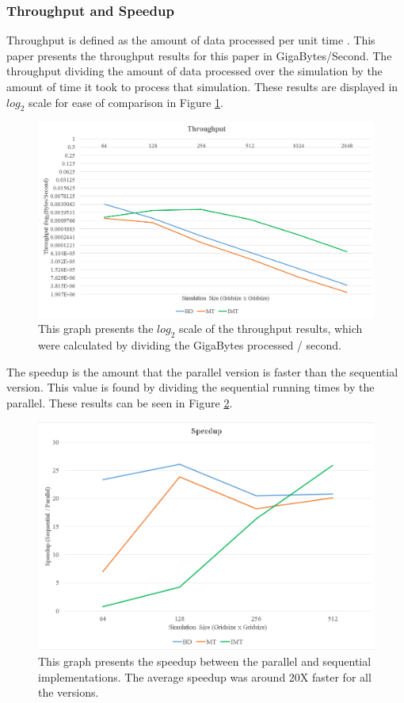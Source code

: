 \subsubsection{Throughput and Speedup}
Throughput is defined as the amount of data processed per unit time \cite{cuda}. This paper presents the throughput results for this paper in GigaBytes/Second. The throughput dividing the amount of data processed over the simulation by the amount of time it took to process that simulation. These results are displayed in $log_2$ scale for ease of comparison in Figure \ref{fig:throughput}.
\begin{figure}[H]
\centering
  \includegraphics[width=\textwidth]{figures/results/throughput.png}
  \caption{This graph presents the $log_2$ scale of the throughput results, which were calculated by dividing the GigaBytes processed / second.}
  \label{fig:throughput}
\end{figure} 

The speedup is the amount that the parallel version is faster than the sequential version. This value is found by dividing the sequential running times by the parallel. These results can be seen in Figure \ref{fig:speedup}. 
\begin{figure}[H]
\centering
  \includegraphics[width=\textwidth]{figures/results/speedup.png}
  \caption{This graph presents the speedup between the parallel and sequential implementations. The average speedup was around 20X faster for all the versions.}
  \label{fig:speedup}
\end{figure} 

